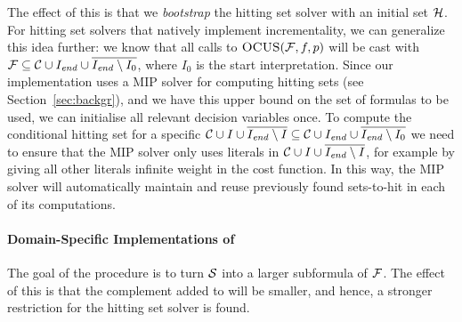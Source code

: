 The effect of this is that we \textit{bootstrap} the hitting set solver with an initial set $\mathcal{H}$. For hitting set solvers that natively implement incrementality, we can generalize this idea further: we know that all calls to $\textsc{OCUS}(\mathcal{F} ,f,p)$ will be cast with $\mathcal{F}  \subseteq \mathcal{C}\cup I_\mathit{end}  \cup \overline{I_\mathit{end}  \setminus I_0}$, where $I_0$ is the start interpretation. Since our implementation uses a MIP solver for computing hitting sets (see Section~\ref{sec:backgr}), and we have this upper bound on the set of formulas to be used, we can initialise all relevant decision variables once. To compute the conditional hitting set for a specific $\mathcal{C} \cup I\cup \overline{I_\mathit{end} \setminus I} \subseteq \mathcal{C}\cup I_\mathit{end}  \cup \overline{I_\mathit{end}  \setminus I_0}$ we need to ensure that the MIP solver only uses literals in $\mathcal{C} \cup I\cup \overline{I_\mathit{end} \setminus I}$, for example by giving all other literals infinite weight in the cost function. In this way, the MIP solver will automatically maintain and reuse previously found sets-to-hit in each of its computations. 




\paragraph{Domain-Specific Implementations of \grow} \label{para:domainspecificgrow}

The goal of the \grow procedure is to turn $\mathcal{S}$ into a larger subformula of $\mathcal{F} $. The effect of this is that the complement added to \setstohit will be smaller, and hence, a stronger restriction for the hitting set solver is found.  

